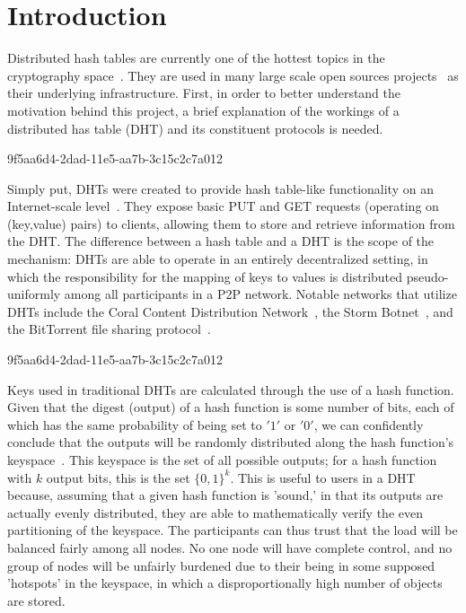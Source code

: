 \documentclass[12pt]{article}
\begin{document}
\section{Introduction}
\par Distributed hash tables are currently one of the hottest topics in the cryptography space~\cite{Stoica:2001dj,Rowstron:2001ea,Ratnasamy:2001wn}. They are used in many large scale open sources projects~\cite{Freitas:2013tb,Xu:2010vs,Perfitt:2010fh} as their underlying infrastructure. First, in order to better understand the motivation behind this project, a brief explanation of the workings of a distributed has table (DHT) and its constituent protocols is needed.

9f5aa6d4-2dad-11e5-aa7b-3c15c2c7a012\par Simply put, DHTs were created to provide hash table-like functionality on an Internet-scale level~\cite{Ratnasamy:2001wn}. They expose basic PUT and GET requests (operating on (key,value) pairs) to clients, allowing them to store and retrieve information from the DHT. The difference between a hash table and a DHT is the scope of the mechanism: DHTs are able to operate in an entirely decentralized setting, in which the responsibility for the mapping of keys to values is distributed pseudo-uniformly among all participants in a P2P network. Notable networks that utilize DHTs include the Coral Content Distribution Network~\cite{Freedman:2004vb}, the Storm Botnet~\cite{Holz:2008uk}, and the BitTorrent file sharing protocol~\cite{Cohen:y1_8mBnw}.

9f5aa6d4-2dad-11e5-aa7b-3c15c2c7a012\par Keys used in traditional DHTs are calculated through the use of a hash function. Given that the digest (output) of a hash function is some number of bits, each of which has the same probability of being set to $'1'$ or $'0'$, we can confidently conclude that the outputs will be randomly distributed along the hash function's keyspace~. This keyspace is the set of all possible outputs; for a hash function with $k$ output bits, this is the set $\{0,1\}^k$. This is useful to users in a DHT because, assuming that a given hash function is 'sound,' in that its outputs are actually evenly distributed, they are able to mathematically verify the even partitioning of the keyspace. The participants can thus trust that the load will be balanced fairly among all nodes. No one node will have complete control, and no group of nodes will be unfairly burdened due to their being in some supposed 'hotspots' in the keyspace, in which a disproportionally high number of objects are stored.~
\end{document}
